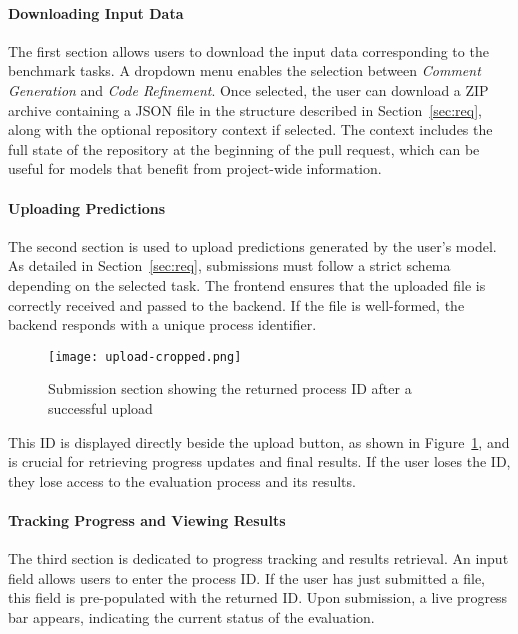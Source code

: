 \paragraph{Downloading Input Data}

The first section allows users to download the input data corresponding to the benchmark tasks. A
dropdown menu enables the selection between \textit{Comment Generation} and \textit{Code
	Refinement}. Once selected, the user can download a ZIP archive containing a JSON file in the
structure described in Section~\ref{sec:req}, along with the optional repository context if
selected. The context includes the full state of the repository at the beginning of the pull
request, which can be useful for models that benefit from project-wide information.

\paragraph{Uploading Predictions}

The second section is used to upload predictions generated by the user's model. As detailed in
Section~\ref{sec:req}, submissions must follow a strict schema depending on the selected task. The
frontend ensures that the uploaded file is correctly received and passed to the backend. If the file
is well-formed, the backend responds with a unique process identifier.

\begin{figure}[H]
	\centering
	\texttt{[image: upload-cropped.png]}
	\caption{Submission section showing the returned process ID after a successful upload}
	\label{fig:upload-id}
\end{figure}

This ID is displayed directly beside the upload button, as shown in Figure~\ref{fig:upload-id}, and
is crucial for retrieving progress updates and final results. If the user loses the ID, they lose
access to the evaluation process and its results.

\paragraph{Tracking Progress and Viewing Results}

The third section is dedicated to progress tracking and results retrieval. An input field allows
users to enter the process ID. If the user has just submitted a file, this field is pre-populated
with the returned ID. Upon submission, a live progress bar appears, indicating the current status of
the evaluation.

